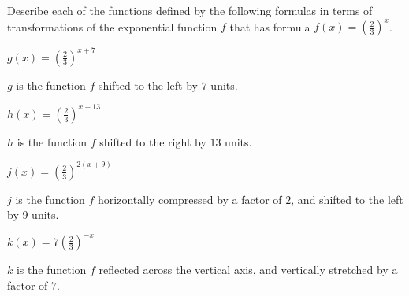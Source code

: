 \begin{exercises}
\begin{problem}
Describe each of the functions defined by the following formulas in terms of transformations 
of the exponential function $f$ that has formula $f(x)=\left( \frac{2}{3} \right)^x$. 
\begin{multicols}{4}
	\begin{subproblem}
		$g(x)=\left( \frac{2}{3} \right)^{x+7}$ 
		\begin{shortsolution}
			$g$ is the function $f$ shifted to the left by $7$ units. 
		\end{shortsolution}
	\end{subproblem}
	\begin{subproblem}
		$h(x)=\left( \frac{2}{3} \right)^{x-13}$ 
		\begin{shortsolution}
			$h$ is the function $f$ shifted to the right by $13$ units. 
		\end{shortsolution}
	\end{subproblem}
	\begin{subproblem}
		$j(x)=\left( \frac{2}{3} \right)^{2(x+9)}$ 
		\begin{shortsolution}
			$j$ is the function $f$ horizontally compressed by a factor of $2$, 
			and shifted to the left by $9$ units. 
		\end{shortsolution}
	\end{subproblem}
	\begin{subproblem}
		$k(x)=7\left( \frac{2}{3} \right)^{-x}$ 
		\begin{shortsolution}
			$k$ is the function $f$ reflected across the vertical axis, and vertically
			stretched by a factor of $7$. 
		\end{shortsolution}
	\end{subproblem}
\end{multicols}
\end{problem}
\end{exercises}
